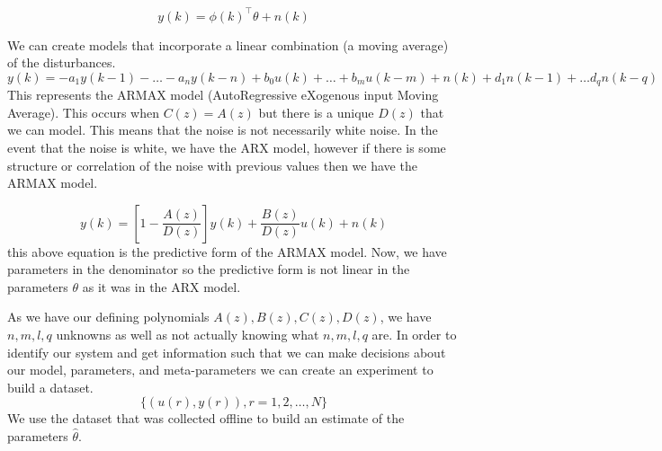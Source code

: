 \documentclass[11pt]{article}
\begin{document}
\begin{equation}
    y(k) = \phi(k)^\top \theta + n(k)
\end{equation}

We can create models that incorporate a linear combination (a moving average) of the disturbances.
\begin{equation}
    y(k) = -a_1 y(k-1) - \dots - a_n y(k-n) + b_0 u(k) + \dots + b_m u(k-m) + n(k) + d_1 n(k-1) + \dots d_q n(k-q)
\end{equation}
This represents the ARMAX model (AutoRegressive eXogenous input Moving Average).
This occurs when $C(z) = A(z)$ but there is a unique $D(z)$ that we can model.
This means that the noise is not necessarily white noise.
In the event that the noise is white, we have the ARX model, however if there is some structure or correlation of the noise with previous values then we have the ARMAX model.

\begin{equation}
    y(k) = [1-\frac{A(z)}{D(z)}] y(k) + \frac{B(z)}{D(z)} u(k) + n(k)
\end{equation}
this above equation is the predictive form of the ARMAX model.
Now, we have parameters in the denominator so the predictive form is not linear in the parameters $\theta$ as it was in the ARX model.

As we have our defining polynomials $A(z), B(z), C(z), D(z)$, we have $n,m,l,q$ unknowns as well as not actually knowing what $n,m,l,q$ are.
In order to identify our system and get information such that we can make decisions about our model, parameters, and meta-parameters we can create an experiment to build a dataset.
\begin{equation}
    \{ (u(r), y(r)), r = 1,2,\dots,N \}
\end{equation}
We use the dataset that was collected offline to build an estimate of the parameters $\hat{\theta}$.




\end{document}
